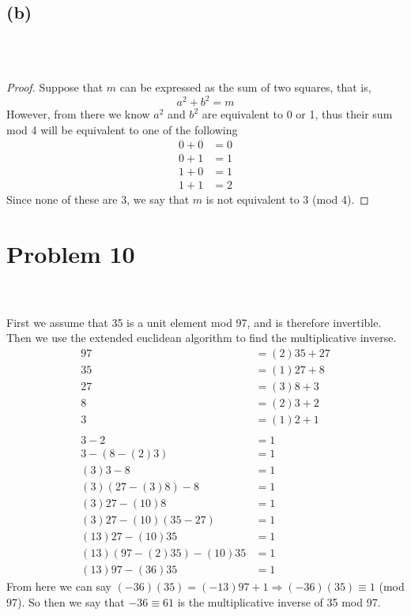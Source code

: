 \documentclass{article}
\theoremstyle{definition}
\begin{document}
\subsection*{(b)}
\\\\
\begin{proof}
Suppose that $m$ can be expressed as the sum of two squares, that is,
\[
    a^2 + b^2 = m
\]
However, from there we know $a^2$ and $b^2$ are equivalent to 0 or 1, thus their sum mod 4 will be equivalent to one of the following
\begin{align*}
    0 + 0 &= 0 \\
    0 + 1 &= 1 \\
    1 + 0 &= 1 \\
    1 + 1 &= 2
\end{align*}
Since none of these are 3, we say that $m$ is not equivalent to 3 (mod 4).
\end{proof}
\section*{Problem 10}
\\\\
First we assume that 35 is a unit element mod 97, and is therefore invertible.
Then we use the extended euclidean algorithm to find the multiplicative inverse.
\begin{align*}
    97 & = (2)35 + 27 \\
    35 & = (1) 27 + 8 \\
    27 & = (3)8 + 3 \\
    8 & = (2)3 + 2 \\
    3 & = (1)2 + 1 \\\\
    3 - 2 & = 1 \\
    3 - (8 - (2)3) & = 1 \\
    (3)3 - 8 & = 1\\
    (3)(27 - (3)8) - 8 & = 1 \\
    (3)27 - (10)8 & = 1 \\
    (3)27 - (10)(35 - 27) & = 1 \\
    (13)27 - (10)35 & = 1 \\
    (13)(97 - (2)35) - (10)35 & = 1 \\ 
    (13)97 - (36)35 & = 1
\end{align*}
From here we can say $(-36)(35) = (-13)97 + 1 \Longrightarrow (-36)(35) \equiv 1$ (mod 97).
So then we say that $-36 \equiv 61$ is the multiplicative inverse of 35 mod 97. 
\end{document}

